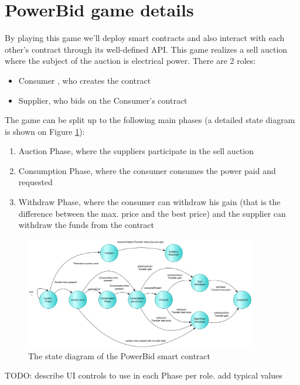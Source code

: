 \documentclass[a4paper]{article}
\begin{document}
\section{PowerBid game details}

By playing this game we'll deploy smart contracts and also interact with each other's contract through its well-defined API. This game realizes a sell auction where the subject of the auction is electrical power. There are 2 roles:
\begin{itemize}
\item Consumer , who creates the contract
\item Supplier, who bids on the Consumer's contract
\end{itemize}

The game can be split up to the following main phases (a detailed state diagram is shown on Figure \ref{fig:State-diagram-powerbid}):

\begin{enumerate}
    \item Auction Phase, where the suppliers participate in the sell auction
    \item Consumption Phase, where the consumer consumes the power paid and requested
    \item Withdraw Phase, where the consumer can withdraw his gain (that is the difference between the max. price and the best price) and the supplier can withdraw the funds from the contract
\end{enumerate}


\begin{figure}[H]
    \centering
    \includegraphics[width=0.9\textwidth]{figures/state_diagram.png}
    \caption{The state diagram of the PowerBid smart contract}
    \label{fig:State-diagram-powerbid}
\end{figure}

TODO: describe UI controls to use in each Phase per role. add typical values
\end{document}
